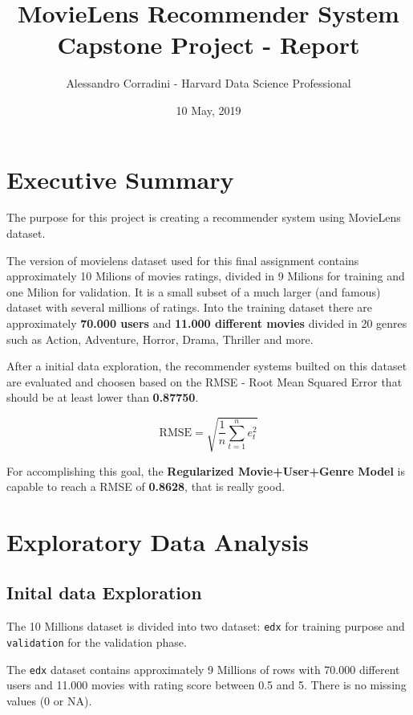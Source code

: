 \documentclass[]{article}
\title{MovieLens Recommender System Capstone Project - Report}
\author{Alessandro Corradini - Harvard Data Science Professional}
\date{10 May, 2019}
\begin{document}
\maketitle

{
\setcounter{tocdepth}{2}
\tableofcontents
}
\newpage

\hypertarget{executive-summary}{%
\section{Executive Summary}\label{executive-summary}}

The purpose for this project is creating a recommender system using
MovieLens dataset.

The version of movielens dataset used for this final assignment contains
approximately 10 Milions of movies ratings, divided in 9 Milions for
training and one Milion for validation. It is a small subset of a much
larger (and famous) dataset with several millions of ratings. Into the
training dataset there are approximately \textbf{70.000 users} and
\textbf{11.000 different movies} divided in 20 genres such as Action,
Adventure, Horror, Drama, Thriller and more.

After a initial data exploration, the recommender systems builted on
this dataset are evaluated and choosen based on the RMSE - Root Mean
Squared Error that should be at least lower than \textbf{0.87750}.

\[\mbox{RMSE} = \sqrt{\frac{1}{n}\sum_{t=1}^{n}e_t^2}\]

For accomplishing this goal, the \textbf{Regularized Movie+User+Genre
Model} is capable to reach a RMSE of \textbf{0.8628}, that is really
good.

\hypertarget{exploratory-data-analysis}{%
\section{Exploratory Data Analysis}\label{exploratory-data-analysis}}

\hypertarget{inital-data-exploration}{%
\subsection{Inital data Exploration}\label{inital-data-exploration}}

The 10 Millions dataset is divided into two dataset: \texttt{edx} for
training purpose and \texttt{validation} for the validation phase.

The \texttt{edx} dataset contains approximately 9 Millions of rows with
70.000 different users and 11.000 movies with rating score between 0.5
and 5. There is no missing values (0 or NA).
\end{document}
